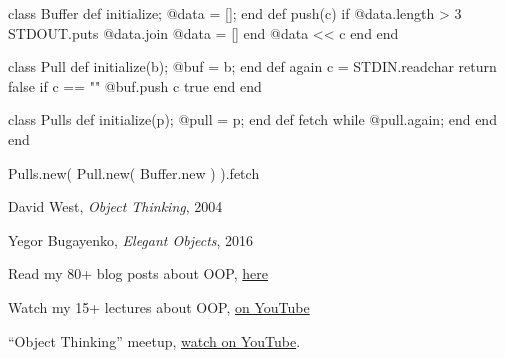 \documentclass{article}
\begin{document}
\begin{pptWide}{2}
{\scriptsize\begin{ffcode}
class Buffer
  def initialize; @data = []; end
  def push(c)
    if @data.length > 3
      STDOUT.puts @data.join
      @data = []
    end
    @data << c
  end
end

class Pull
  def initialize(b); @buf = b; end
  def again
    c = STDIN.readchar
    return false if c == "\n"
    @buf.push c
    true
  end
end

class Pulls
  def initialize(p); @pull = p; end
  def fetch
    while @pull.again; end
  end
end

Pulls.new(
  Pull.new(
    Buffer.new
  )
).fetch
\end{ffcode}
}
\end{pptWide}
\plush{}









David West, \emph{Object Thinking}, 2004

Yegor Bugayenko, \emph{Elegant Objects}, 2016

Read my 80+ blog posts about OOP, \href{https://www.yegor256.com/tag/oop}{here}

Watch my 15+ lectures about OOP, \href{https://www.youtube.com/playlist?list=PLaIsQH4uc08yw2CsNv5OV30GfKE6XVGii}{on YouTube}

``Object Thinking'' meetup, \href{https://www.youtube.com/watch?v=yT6oO28wEik&list=PLaIsQH4uc08yetzX86w1pPck1QtGEy_ik}{watch on YouTube}.
\end{document}
